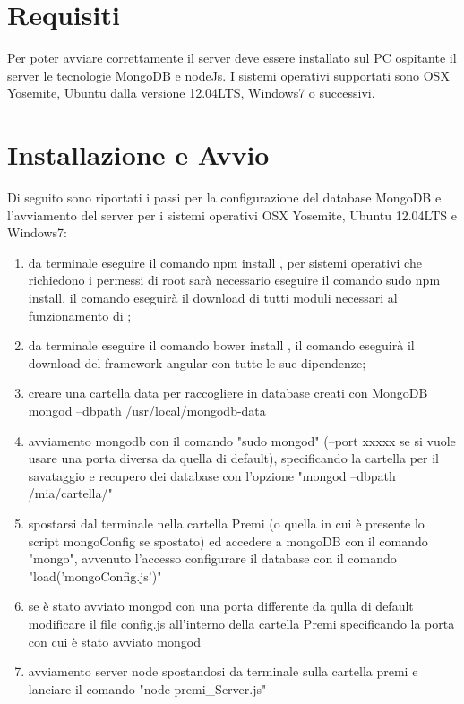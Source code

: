 \section{Requisiti}
Per poter avviare correttamente il server deve essere installato sul PC ospitante il server le tecnologie MongoDB e nodeJs. I sistemi operativi supportati sono OSX Yosemite, Ubuntu dalla versione 12.04LTS, Windows7 o successivi.

\section{Installazione e Avvio}

Di seguito sono riportati i passi per la configurazione del database MongoDB e l'avviamento del server per i sistemi operativi OSX Yosemite, Ubuntu  12.04LTS e Windows7:

\begin{enumerate}
\item da terminale eseguire il comando npm install , per sistemi operativi che richiedono i permessi di root sarà necessario eseguire il comando sudo npm install, il comando eseguirà il download di tutti moduli necessari al funzionamento di \premi;
\item da terminale eseguire il comando bower install , il comando eseguirà il download del framework angular con tutte le sue dipendenze;
\item creare una cartella data per raccogliere in database creati con MongoDB
mongod --dbpath /usr/local/mongodb-data
\item avviamento mongodb con il comando "sudo mongod" (--port xxxxx se si vuole usare una porta diversa da quella di default), specificando la cartella per il savataggio e recupero dei database con l'opzione "mongod --dbpath /mia/cartella/"
\item  spostarsi dal terminale nella cartella Premi (o quella in cui \`{e} presente lo script mongoConfig se spostato) ed accedere a mongoDB con il comando "mongo", avvenuto l'accesso configurare il database con il comando "load('mongoConfig.js')"
\item se \`{e} stato avviato mongod con una porta differente da qulla di default modificare il file config.js all'interno della cartella Premi specificando la porta con cui \`{e} stato avviato mongod
\item  avviamento server node spostandosi da terminale sulla cartella premi e lanciare il comando "node premi\_Server.js" %

\end{enumerate}
